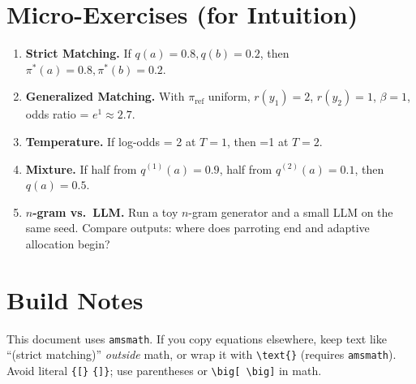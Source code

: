 \documentclass[11pt]{article}
\begin{document}
\section{Micro-Exercises (for Intuition)}
\begin{enumerate}[leftmargin=*]
  \item \textbf{Strict Matching.} If $q(a)=0.8,q(b)=0.2$, then $\pi^*(a)=0.8,\pi^*(b)=0.2$.  
  \item \textbf{Generalized Matching.} With $\pi_{\mathrm{ref}}$ uniform, $r(y_1)=2$, $r(y_2)=1$, $\beta=1$, odds ratio = $e^1\approx 2.7$.  
  \item \textbf{Temperature.} If log-odds = 2 at $T=1$, then =1 at $T=2$.  
  \item \textbf{Mixture.} If half from $q^{(1)}(a)=0.9$, half from $q^{(2)}(a)=0.1$, then $q(a)=0.5$.  
  \item \textbf{$n$-gram vs.\ LLM.} Run a toy $n$-gram generator and a small LLM on the same seed. Compare outputs: where does parroting end and adaptive allocation begin?  
\end{enumerate}

\section*{Build Notes}
This document uses \texttt{amsmath}. If you copy equations elsewhere, keep text like “(strict matching)” \emph{outside} math, or wrap it with \verb|\text{}| (requires \texttt{amsmath}). Avoid literal \verb|{[}| \verb|{]}|; use parentheses or \verb|\big[ \big]| in math.
\end{document}
